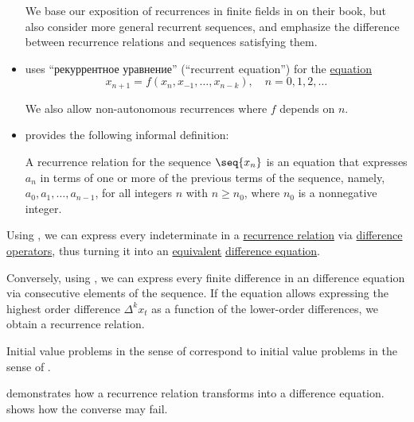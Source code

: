 \begin{remark}
\begin{itemize}
    We base our exposition of recurrences in finite fields in  on their book, but also consider more general recurrent sequences, and emphasize the difference between recurrence relations and sequences satisfying them.

    \item {} uses \enquote{рекуррентное уравнение} (\enquote{recurrent equation}) for the \hyperref[def:equation]{equation}
    \begin{equation*}
      x_{n+1} = f(x_n, x_{-1}, \ldots, x_{n-k}), \quad n = 0, 1, 2, \ldots
    \end{equation*}

    We also allow non-autonomous recurrences where \( f \) depends on \( n \).

    \item {} provides the following informal definition:
    \begin{displayquote}
      A recurrence relation for the sequence \( \seq{ x_n } \) is an equation that expresses \( a_n \) in terms of one or more of the previous terms of the sequence, namely, \( a_0, a_1, \ldots, a_{n-1} \), for all integers \( n \) with \( n \geq n_0 \), where \( n_0 \) is a nonnegative integer.
    \end{displayquote}
  \end{itemize}
\end{remark}

\begin{proposition}\label{thm:recurrence_relations_and_difference_equations}
  Using , we can express every indeterminate in a \hyperref[def:recurrence_relation]{recurrence relation} via \hyperref[def:finite_difference_operator]{difference operators}, thus turning it into an \hyperref[def:equation/equivalent]{equivalent} \hyperref[def:difference_equation]{difference equation}.

  Conversely, using , we can express every finite difference in an difference equation via consecutive elements of the sequence. If the equation allows expressing the highest order difference \( \Delta^k x_t \) as a function of the lower-order differences, we obtain a recurrence relation.
\end{proposition}
\begin{comments}
  \item Initial value problems in the sense of  correspond to initial value problems in the sense of .

  \item {} demonstrates how a recurrence relation transforms into a difference equation.  shows how the converse may fail.
\end{comments}

